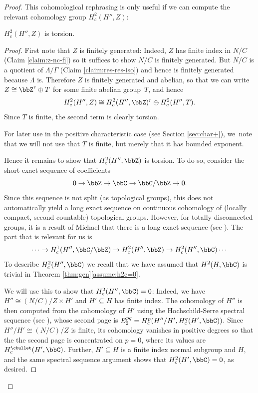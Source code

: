 \begin{proof}
This cohomological rephrasing is only useful if we can compute the relevant cohomology group $H^2_c(H'',Z)$:

\begin{claim}\label{claim:h2-tor}
$H^2_c(H'',Z)$ is torsion.
\end{claim}
\begin{proof} First note that $Z$ is finitely generated: Indeed, $Z$ has finite index in $N/C$ (Claim \ref{claim:z-nc-fi}) so it suffices to show $N/C$ is finitely generated. But $N/C$ is a quotient of $\Lambda/\Gamma$ (Claim \ref{claim:res-res-iso}) and hence is finitely generated because $\Lambda$ is. Therefore $Z$ is finitely generated and abelian, so that we can write $Z\cong \bbZ^r \oplus T$ for some finite abelian group~$T$, and hence
\[
H^2_c(H'',Z)\cong H^2_c(H'',\bbZ)^r \oplus H^2_c(H'',T).
\]
Since $T$ is finite, the second term is clearly torsion.
\begin{rem} For later use in the positive characteristic case (see Section \ref{sec:char+}), we~note that we will not use that $T$ is finite, but merely that it has bounded exponent. \end{rem}
Hence it remains to show that $H^2_c(H'',\bbZ)$ is torsion. To do so, consider the short exact sequence of coefficients
\begin{equation}\label{eq:ses-coeff}
0\to \bbZ\to \bbC\to \bbC/\bbZ\to 0.
\end{equation}
Since this sequence is not split (as topological groups), this does not automatically yield a long exact sequence on continuous cohomology of (locally compact, second countable) topological groups. However, for totally disconnected groups, it is a result of Michael that there is a long exact sequence (see \cite[Th.\,M]{wigner-cohomology}). The part that is relevant for us is
\begin{equation}\label{eq:les-coeff}
\cdots \to H^1_c(H'',\bbC/\bbZ)\to H^2_c(H'',\bbZ)\to H^2_c(H'',\bbC) \cdots
\end{equation}
To describe $H^2_c(H'',\bbC)$ we recall that we have assumed that $H^2(H,\bbC)$ is trivial in
Theorem \ref{thm:gen}\eqref{assume:h2c=0}.

We will use this to show that $H^2_c(H'',\bbC)=0$: Indeed, we have $H''\cong (N/C)/Z\times H'$ and $H'\subseteq H$ has finite index. The cohomology of $H''$ is then computed from the cohomology of $H'$ using the Hochschild-Serre spectral sequence (see \cite[Prop.\,5]{casselman-wigner}), whose second page is $E_2^{pq}=H^p_c(H''/H', H^q_c(H',\bbC))$. Since $H''/H'\cong (N/C)/Z$ is finite, its cohomology vanishes in positive degrees so that the the second page is concentrated on $p=0$, where its values are $H^\cbullet_c(H',\bbC)$. Further, $H'\subseteq H$ is a finite index normal subgroup and $H$,
and the same spectral sequence argument shows that $H^2_c(H',\bbC)=0$, as desired.


\end{proof}
\end{proof}
